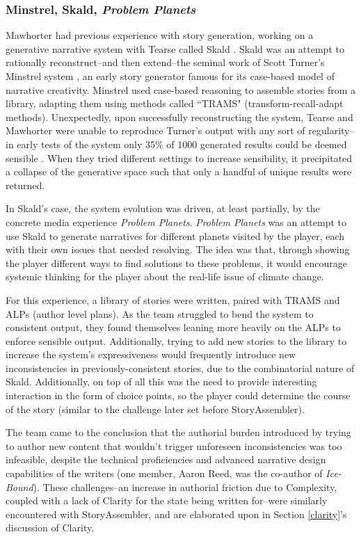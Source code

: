 \subsubsection{Minstrel, Skald, \textit{Problem Planets}}

Mawhorter had previous experience with story generation, working on a generative narrative system with Tearse called Skald \cite{tearse_skald}. Skald was an attempt to rationally reconstruct--and then extend--the seminal work of Scott Turner's Minstrel system \cite{minstrel}, an early story generator famous for its case-based model of narrative creativity. Minstrel used case-based reasoning to assemble stories from a library, adapting them using methods called ``TRAMS" (transform-recall-adapt methods). Unexpectedly, upon successfully reconstructing the system, Tearse and Mawhorter were unable to reproduce Turner's output with any sort of regularity--in early tests of the system only 35\% of 1000 generated results could be deemed sensible \cite{tearse_results}. When they tried different settings to increase sensibility, it precipitated a collapse of the generative space such that only a handful of unique results were returned.

In Skald's case, the system evolution was driven, at least partially, by the concrete media experience \textit{Problem Planets}. \textit{Problem Planets} was an attempt to use Skald to generate narratives for different planets visited by the player, each with their own issues that needed resolving. The idea was that, through showing the player different ways to find solutions to these problems, it would encourage systemic thinking for the player about the real-life issue of climate change.

For this experience, a library of stories were written, paired with TRAMS and ALPs (author level plans). As the team struggled to bend the system to consistent output, they found themselves leaning more heavily on the ALPs to enforce sensible output. Additionally, trying to add new stories to the library to increase the system's expressiveness would frequently introduce new inconsistencies in previously-consistent stories, due to the combinatorial nature of Skald. Additionally, on top of all this was the need to provide interesting interaction in the form of choice points, so the player could determine the course of the story (similar to the challenge later set before StoryAssembler).

The team came to the conclusion that the authorial burden introduced by trying to author new content that wouldn't trigger unforeseen inconsistencies was too infeasible, despite the technical proficiencies and advanced narrative design capabilities of the writers (one member, Aaron Reed, was the co-author of \textit{Ice-Bound}). These challenges--an increase in authorial friction due to Complexity, coupled with a lack of Clarity for the state being written for--were similarly encountered with StoryAssembler, and are elaborated upon in Section \ref{clarity}'s discussion of Clarity.

